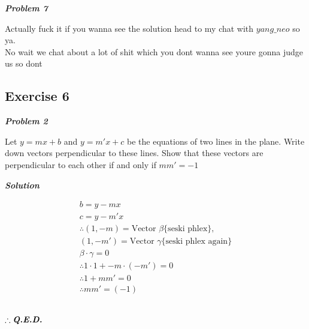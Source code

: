 \documentclass{article}
\newcommand{\qst}[1]{\begin{center}\textit{\textbf{Problem #1}}\end{center}}
\newcommand{\sol}{\begin{center}\textit{\textbf{Solution}}\end{center}}
\newcommand{\thf}{\\\therefore}
\newcommand{\qed}{\\\begin{center}$\therefore \textbf{\textit{Q.E.D.}}$\end{center}}
\newcommand{\subsec}[1]{\newpage \subsection*{#1}}
\begin{document}
\qst{7}Actually fuck it if you wanna see the solution head to my chat with $yang\_neo$ so ya.
\\No wait we chat about a lot of shit which you dont wanna see youre gonna judge us so dont
\newpage
\subsec{Exercise 6}
\qst{2}
Let  $y  =  mx + b$ and  $y  =  m' x  + c$  be  the  equations  of  two  lines  in  the  plane. Write  down  vectors  perpendicular  to  these  lines. Show  that  these  vectors  are perpendicular  to each  other  if  and  only  if  $mm'  = - 1$
\sol
\begin{gather*}
b=y-mx
\\c=y-m'x
\thf (1, -m)= \text{Vector }\beta \{\text{seski phlex}\},
\\(1, -m')= \text{Vector }\gamma \{\text{seski phlex again}\}
\\\beta \cdot \gamma = 0
\thf 1\cdot 1 + -m\cdot(-m')=0
\thf 1+mm'=0
\thf mm'=(-1)
\end{gather*}
\qed
\end{document}
